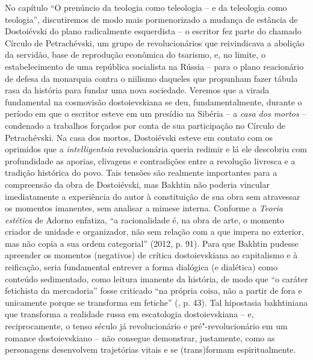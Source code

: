 {{No capítulo ``O prenúncio da teologia como teleologia -- e da teleologia
como teologia'', discutiremos de modo mais pormenorizado a mudança de
estância de Dostoiévski do plano radicalmente esquerdista -- o escritor
fez parte do chamado Círculo de Petrachévski, um grupo de
revolucionários que reivindicava a abolição da servidão, base de
reprodução econômica do tsarismo, e, no limite, o estabelecimento de uma
república socialista na Rússia -- para o plano reacionário de defesa da
monarquia contra o niilismo daqueles que propunham fazer tábula rasa da
história para fundar uma nova sociedade. Veremos que a virada
fundamental na cosmovisão dostoievskiana se deu, fundamentalmente,
durante o período em que o escritor esteve em um presídio na Sibéria --
a \emph{casa dos mortos} -- condenado a trabalhos forçados por conta de
sua participação no Círculo de Petrachévski. Na casa dos mortos\emph{,}
Dostoiévski esteve em contato com os oprimidos que a
\emph{intelligentsia} revolucionária queria redimir e lá ele descobriu
com profundidade as aporias, clivagens e contradições entre a revolução
livresca e a tradição histórica do povo. Tais tensões são realmente
importantes para a compreensão da obra de Dostoiévski, mas Bakhtin não
poderia vincular imediatamente a experiência do autor à constituição de
sua obra sem atravessar os momentos imanentes, sem analisar a mimese
interna. Conforme a \emph{Teoria estética} de Adorno enfatiza, ``a
racionalidade é, na obra de arte, o momento criador de unidade e
organizador, não sem relação com a que impera no exterior, mas não copia
a sua ordem categorial'' (2012, p. 91). Para que Bakhtin pudesse
apreender os momentos (negativos) de crítica dostoievskiana ao
capitalismo e à reificação, seria fundamental entrever a forma dialógica
(e dialética) como conteúdo sedimentado, como leitura imanente da
história, de modo que ``o caráter fetichista da mercadoria'' fosse
criticado ``na própria coisa, não a partir de fora e unicamente porque
se transforma em fetiche'' (, p. 43). Tal hipostasia bakhtiniana que
transforma a realidade russa em escatologia dostoievskiana -- e,
reciprocamente, o tenso século  já revolucionário e
pré"-revolucionário em um romance dostoievskiano -- não consegue
demonstrar, justamente, como as personagens desenvolvem trajetórias
vitais e se (trans)formam espiritualmente.

}}
